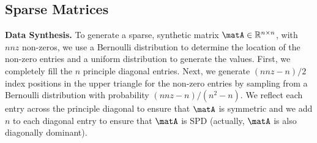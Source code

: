 \subsection{Sparse Matrices}

\label{subsec:sparse_matrices}
\vspace{0.02in}\noindent \textbf{Data Synthesis.}
To generate a sparse, synthetic matrix $\matA\in{}\mathbb{R}^{n\times{}n}$, with
$nnz$ non-zeros, we use a Bernoulli distribution to determine the location of
the non-zero entries and a uniform distribution to generate the values.
First, we completely fill the $n$ principle diagonal entries.
Next, we generate $(nnz-n)/2$ index positions in the upper triangle for
the non-zero entries by sampling from a Bernoulli distribution with
probability $(nnz-n)/(n^2-n)$.
We reflect each entry across the principle diagonal to ensure that $\matA$ is symmetric and we add $n$ to each diagonal entry to ensure that $\matA$ is SPD (actually, $\matA$ is also diagonally dominant).


